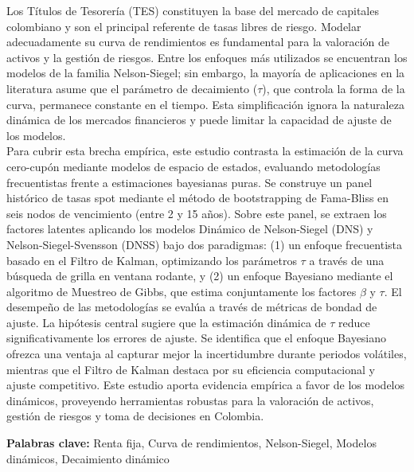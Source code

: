 \documentclass[article,10pt,twoside,a4paper,twocolumn,hidelinks,english,brazil]{abntex2}
\begin{document}
\renewcommand{\resumoname}{\texorpdfstring{\fontsize{14pt}{16.8pt} \fontfamily{ptm} \selectfont \textbf{Resumen} \\[-0.3cm] \rule{0.91\textwidth}{0.3pt} \vspace{-0.3cm}}{Abstract}}
\begin{resumoumacoluna}
    \normalsize



Los Títulos de Tesorería (TES) constituyen la base del mercado de capitales colombiano y son el principal referente 
de tasas libres de riesgo. Modelar adecuadamente su curva de rendimientos es fundamental para la valoración de activos y 
la gestión de riesgos. Entre los enfoques más utilizados se encuentran los modelos de la familia Nelson-Siegel; sin embargo, 
la mayoría de aplicaciones en la literatura asume que el parámetro de decaimiento ($\tau$), que controla la forma de la curva, 
permanece constante en el tiempo. Esta simplificación ignora la naturaleza dinámica de los mercados financieros y puede limitar 
la capacidad de ajuste de los modelos.
\\


Para cubrir esta brecha empírica, 
este estudio contrasta la estimación de la curva cero-cupón mediante modelos de espacio de estados, 
evaluando metodologías frecuentistas frente a estimaciones bayesianas puras. Se construye un 
panel histórico de tasas spot mediante el método de bootstrapping de Fama-Bliss en seis nodos de vencimiento
(entre 2 y 15 años). Sobre este panel, se extraen los factores latentes aplicando los modelos Dinámico de Nelson-Siegel
(DNS) y Nelson-Siegel-Svensson (DNSS) bajo dos paradigmas: (1) un enfoque frecuentista basado en el Filtro de Kalman, 
optimizando los parámetros $\tau$ a través de una búsqueda de grilla en ventana rodante, y (2) un enfoque Bayesiano 
mediante el algoritmo de Muestreo de Gibbs, que estima conjuntamente los factores $\beta$ y $\tau$. El desempeño de 
las metodologías se evalúa a través de métricas de bondad de ajuste. La hipótesis 
central sugiere que la estimación dinámica de $\tau$ reduce significativamente los errores de ajuste. Se identifica 
que el enfoque Bayesiano ofrezca una ventaja al capturar mejor la incertidumbre durante periodos volátiles,
mientras que el Filtro de Kalman destaca por su eficiencia computacional y ajuste competitivo. Este estudio 
aporta evidencia empírica a favor de los modelos dinámicos, proveyendo herramientas robustas para 
la valoración de activos, gestión de riesgos y toma de decisiones en Colombia.

\vspace{0.4 cm}
    \noindent \textbf{Palabras clave:} Renta fija, Curva de rendimientos, Nelson-Siegel, Modelos dinámicos,
                                       Decaimiento dinámico

\end{resumoumacoluna}
\end{document}

